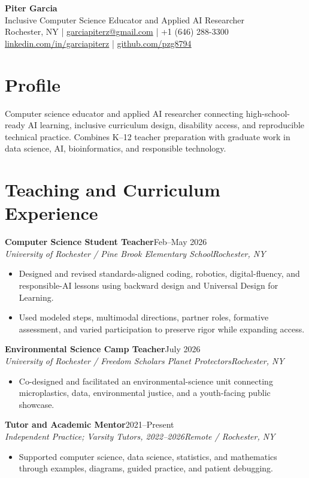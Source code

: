 \documentclass[10pt,letterpaper]{article}
\newcommand{\role}[4]{\textbf{#1}\hfill #2\\\textit{#3}\hfill\textit{#4}\vspace{-3pt}}
\begin{document}
\fontsize{9}{10.3}\selectfont
\begin{center}
{\Large\bfseries Piter Garcia}\\[1pt]
{\large Inclusive Computer Science Educator and Applied AI Researcher}\\[2pt]
Rochester, NY \enspace|\enspace
\href{mailto:garciapiterz@gmail.com}{garciapiterz@gmail.com} \enspace|\enspace
+1 (646) 288-3300\\
\href{https://linkedin.com/in/garciapiterz}{linkedin.com/in/garciapiterz} \enspace|\enspace
\href{https://github.com/pzg8794}{github.com/pzg8794}
\end{center}

\section*{Profile}
Computer science educator and applied AI researcher connecting high-school-ready
AI learning, inclusive curriculum design, disability access, and reproducible
technical practice. Combines K--12 teacher preparation with graduate work in
data science, AI, bioinformatics, and responsible technology.

\section*{Teaching and Curriculum Experience}
\role{Computer Science Student Teacher}{Feb--May 2026}
{University of Rochester / Pine Brook Elementary School}{Rochester, NY}
\begin{itemize}
  \item Designed and revised standards-aligned coding, robotics, digital-fluency,
  and responsible-AI lessons using backward design and Universal Design for Learning.
  \item Used modeled steps, multimodal directions, partner roles, formative
  assessment, and varied participation to preserve rigor while expanding access.
\end{itemize}

\role{Environmental Science Camp Teacher}{July 2026}
{University of Rochester / Freedom Scholars Planet Protectors}{Rochester, NY}
\begin{itemize}
  \item Co-designed and facilitated an environmental-science unit connecting
  microplastics, data, environmental justice, and a youth-facing public showcase.
\end{itemize}

\role{Tutor and Academic Mentor}{2021--Present}
{Independent Practice; Varsity Tutors, 2022--2026}{Remote / Rochester, NY}
\begin{itemize}
  \item Supported computer science, data science, statistics, and mathematics
  through examples, diagrams, guided practice, and patient debugging.
\end{itemize}
\end{document}
